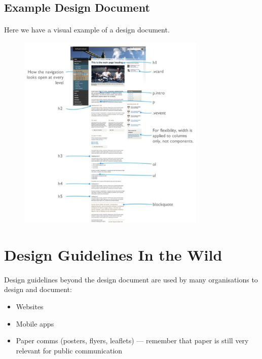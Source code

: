 \subsection{Example Design Document}

\paragraph{} Here we have a visual example of a design document.

\begin{figure}[H]
    \centering
    \includegraphics[width=0.8\textwidth]{figures/design-document-example}
    \label{fig:design-document-example}
    \caption{}
\end{figure}


\section{Design Guidelines In the Wild}
\paragraph{} Design guidelines beyond the design document are used by many organisations to design and document:

\begin{itemize}
	\item Websites
	\item Mobile apps
	\item Paper comms (posters, flyers, leaflets) — remember that paper is still very relevant for public communication
\end{itemize}

